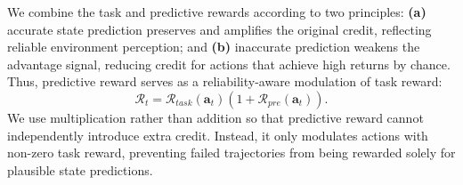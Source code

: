 \documentclass{llmxive}
\providecommand{\bm}[1]{\boldsymbol{#1}}
\begin{document}
We combine the task and predictive rewards according to two principles:
\textbf{(a)} accurate state prediction preserves and amplifies the original credit, reflecting reliable environment perception; and
\textbf{(b)} inaccurate prediction weakens the advantage signal, reducing credit for actions that achieve high returns by chance. Thus, predictive reward serves as a reliability-aware modulation of task reward:
\begin{equation}
    \mathcal{R}_t=\mathcal{R}_{task}(\bm{a}_t)(1+\mathcal{R}_{pre}(\bm{a}_t)).
\end{equation}
We use multiplication rather than addition so that predictive reward cannot independently introduce extra credit. Instead, it only modulates actions with non-zero task reward, preventing failed trajectories from being rewarded solely for plausible state predictions.
\end{document}
